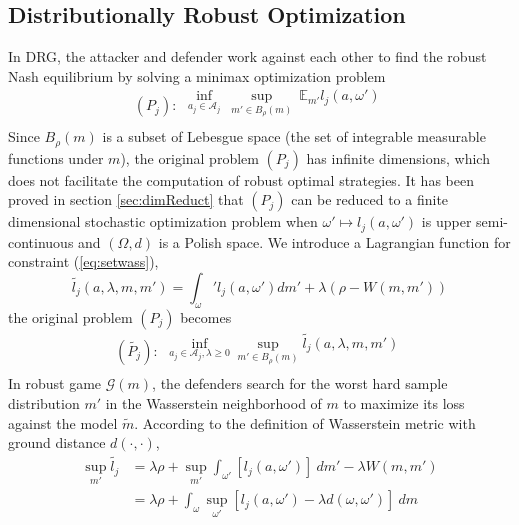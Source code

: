 \documentclass{article}
\begin{document}
\subsection{Distributionally Robust Optimization}
In DRG,
the attacker and defender work against each other to find the robust Nash equilibrium by solving a minimax optimization problem
\begin{equation*}(P_j):
\begin{array}{l}
\inf_{a_j\in \mathcal{A}_j} \ \sup_{m' \in B_{\rho}(m)}\ \mathbb{E}_{m'} l_j(a,\omega') \\
\end{array}
\end{equation*}
Since $B_\rho(m)$ is a subset of Lebesgue space (the set of integrable measurable functions under $m$), the original problem $(P_j)$ has infinite dimensions, which does not facilitate the computation of robust optimal strategies. It has been proved in section \ref{sec:dimReduct} that $(P_j)$ can be reduced to a finite dimensional stochastic optimization problem when $\omega' \mapsto l_j(a,\omega')$ is upper semi-continuous and $(\Omega, d)$ is a Polish space. We introduce a Lagrangian function for constraint (\ref{eq:setwass}),
\begin{equation}
\tilde{l_j}(a,\lambda, m,m') = \int_\omega' l_j(a,\omega') dm' + \lambda(\rho - W(m,m'))
\end{equation}
the original problem $(P_j)$ becomes
\begin{equation}\label{eq:Pj*}(\tilde{P_j}):
\begin{array}{l}
\inf_{a_j\in \mathcal{A}_j, \lambda \geq 0} \sup_{m' \in B_\rho(m)}\tilde{l_j}(a,\lambda,m,m') \\
\end{array}
\end{equation}
In robust game $\mathcal{G}(m)$, the defenders search for the worst hard sample distribution $m'$ in the Wasserstein neighborhood of $m$ to maximize its loss against the model $\tilde{m}$. According to the definition of Wasserstein metric with ground distance $d(\cdot,\cdot)$,
\begin{equation}
\begin{aligned}
\sup_{m'} \tilde{l_j} &= \lambda \rho + \sup_{m'} \int_{\omega'} [l_j(a,\omega')] \ dm' - \lambda W(m,m') \\
&= \lambda \rho + \int_\omega \sup_{\omega'} [l_j(a,\omega') - \lambda d(\omega, \omega')] \ dm
\end{aligned}
\end{equation}
\end{document}

